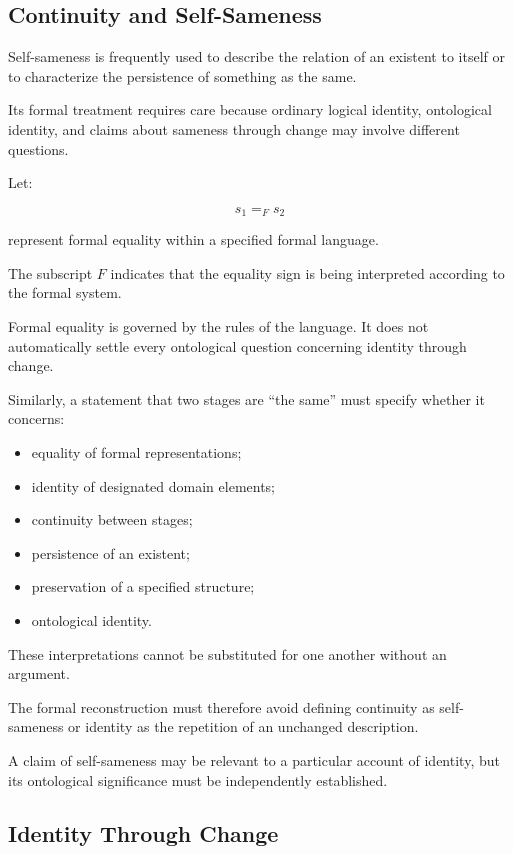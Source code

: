 \subsection{Continuity and Self-Sameness}

Self-sameness is frequently
used to describe the relation
of an existent to itself
or to characterize the
persistence of something
as the same.

Its formal treatment requires
care because ordinary logical
identity, ontological identity,
and claims about sameness
through change may involve
different questions.

Let:

\[
    s_1 =_F s_2
\]

represent formal equality
within a specified formal
language.

The subscript \(F\) indicates
that the equality sign is
being interpreted according
to the formal system.

Formal equality is governed
by the rules of the language.
It does not automatically
settle every ontological
question concerning identity
through change.

Similarly, a statement that
two stages are ``the same''
must specify whether it
concerns:

\begin{itemize}
    \item equality of formal
    representations;
    \item identity of designated
    domain elements;
    \item continuity between
    stages;
    \item persistence of an
    existent;
    \item preservation of a
    specified structure;
    \item ontological identity.
\end{itemize}

These interpretations cannot
be substituted for one another
without an argument.

The formal reconstruction
must therefore avoid defining
continuity as self-sameness
or identity as the repetition
of an unchanged description.

A claim of self-sameness
may be relevant to a particular
account of identity, but
its ontological significance
must be independently established.

\subsection{Identity Through Change}

